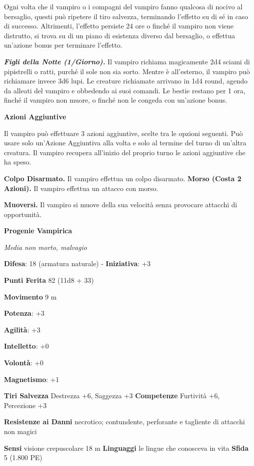 \begin{multicols}{2}
Ogni volta che il vampiro o i compagni del vampiro fanno qualcosa di
nocivo al bersaglio, questi può ripetere il tiro salvezza, terminando
l'effetto su di sé in caso di successo. Altrimenti, l'effetto persiste
24 ore o finché il vampiro non viene distrutto, si trova su di un piano
di esistenza diverso dal bersaglio, o effettua un'azione bonus per
terminare l'effetto.

\emph{\textbf{Figli della Notte (1/Giorno).}} Il vampiro richiama
magicamente 2d4 sciami di pipistrelli o ratti, purché il sole non sia
sorto. Mentre è all'esterno, il vampiro può richiamare invece 3d6 lupi.
Le creature richiamate arrivano in 1d4 round, agendo da alleati del
vampiro e obbedendo ai suoi comandi. Le bestie restano per 1 ora, finché
il vampiro non muore, o finché non le congeda con un'azione bonus.

\textbf{Azioni Aggiuntive}

Il vampiro può effettuare 3 azioni aggiuntive, scelte tra le opzioni
seguenti. Può usare solo un'Azione Aggiuntiva alla volta e solo al
termine del turno di un'altra creatura. Il vampiro recupera all'inizio
del proprio turno le azioni aggiuntive che ha speso.

\textbf{Colpo Disarmato.} Il vampiro effettua un colpo disarmato.
\textbf{Morso (Costa 2 Azioni).} Il vampiro effettua un attacco con
morso.

\textbf{Muoversi.} Il vampiro si muove della sua velocità senza
provocare attacchi di opportunità.

\textbf{Progenie Vampirica}

\emph{Media non morto, malvagio}

\textbf{Difesa}: 18 (armatura naturale) - \textbf{Iniziativa}: +3

\textbf{Punti Ferita} 82 (11d8 + 33)

\textbf{Movimento} 9 m

\textbf{Potenza}: +3

\textbf{Agilità}: +3

\textbf{Intelletto}: +0

\textbf{Volontà}: +0

\textbf{Magnetismo}: +1

\textbf{Tiri Salvezza} Destrezza +6, Saggezza +3 \textbf{Competenze}
Furtività +6, Percezione +3

\textbf{Resistenze ai Danni} necrotico; contundente, perforante e
tagliente di attacchi non magici

\textbf{Sensi} visione crepuscolare 18 m
\textbf{Linguaggi} le lingue che conosceva in vita \textbf{Sfida} 5
(1.800 PE)


\end{multicols}
